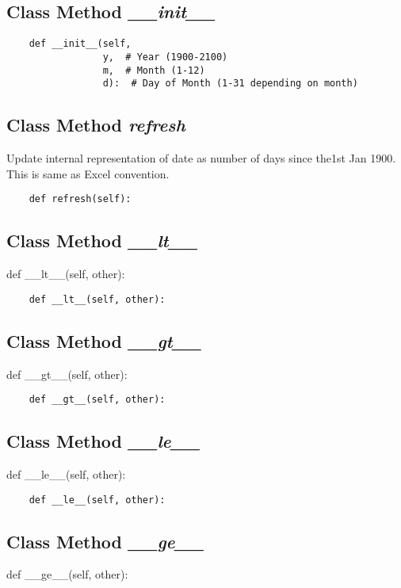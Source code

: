 \documentclass[twoside,11pt]{book}
\begin{document}
\subsection{Class Method {\it \_\_init\_\_}}


\begin{lstlisting}
    def __init__(self,
                 y,  # Year (1900-2100)
                 m,  # Month (1-12)
                 d):  # Day of Month (1-31 depending on month)
\end{lstlisting}

\subsection{Class Method {\it refresh}}
Update internal representation of date as number of days since the1st Jan 1900. This is same as Excel convention. 

\begin{lstlisting}
    def refresh(self):
\end{lstlisting}

\subsection{Class Method {\it \_\_lt\_\_}}
def \_\_lt\_\_(self, other):

\begin{lstlisting}
    def __lt__(self, other):
\end{lstlisting}

\subsection{Class Method {\it \_\_gt\_\_}}
def \_\_gt\_\_(self, other):

\begin{lstlisting}
    def __gt__(self, other):
\end{lstlisting}

\subsection{Class Method {\it \_\_le\_\_}}
def \_\_le\_\_(self, other):

\begin{lstlisting}
    def __le__(self, other):
\end{lstlisting}

\subsection{Class Method {\it \_\_ge\_\_}}
def \_\_ge\_\_(self, other):
\end{document}
